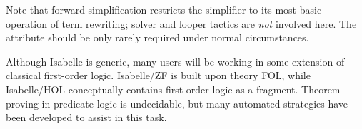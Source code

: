 \begin{isabellebody}
\begin{isamarkuptext}
\begin{description}
  Note that forward simplification restricts the simplifier to its
  most basic operation of term rewriting; solver and looper tactics
  \cite{isabelle-ref} are \emph{not} involved here.  The  attribute should be only rarely required under normal
  circumstances.

  \end{description}%
\end{isamarkuptext}%
\isamarkuptrue%
%
\isamarkuptrue%
%
\isamarkuptrue%
%
\begin{isamarkuptext}%
Although Isabelle is generic, many users will be working in
  some extension of classical first-order logic.  Isabelle/ZF is built
  upon theory FOL, while Isabelle/HOL conceptually contains
  first-order logic as a fragment.  Theorem-proving in predicate logic
  is undecidable, but many automated strategies have been developed to
  assist in this task.


\end{isamarkuptext}
\end{isabellebody}
